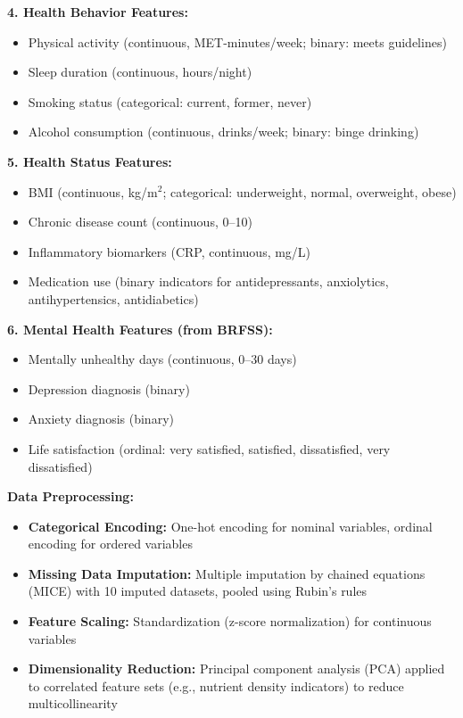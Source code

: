 \documentclass[journal,twoside,10pt]{IEEEtran}
\begin{document}
\textbf{4. Health Behavior Features:}
\begin{itemize}
\item Physical activity (continuous, MET-minutes/week; binary: meets guidelines)
\item Sleep duration (continuous, hours/night)
\item Smoking status (categorical: current, former, never)
\item Alcohol consumption (continuous, drinks/week; binary: binge drinking)
\end{itemize}

\textbf{5. Health Status Features:}
\begin{itemize}
\item BMI (continuous, kg/m$^2$; categorical: underweight, normal, overweight, obese)
\item Chronic disease count (continuous, 0--10)
\item Inflammatory biomarkers (CRP, continuous, mg/L)
\item Medication use (binary indicators for antidepressants, anxiolytics, antihypertensics, antidiabetics)
\end{itemize}

\textbf{6. Mental Health Features (from BRFSS):}
\begin{itemize}
\item Mentally unhealthy days (continuous, 0--30 days)
\item Depression diagnosis (binary)
\item Anxiety diagnosis (binary)
\item Life satisfaction (ordinal: very satisfied, satisfied, dissatisfied, very dissatisfied)
\end{itemize}

\textbf{Data Preprocessing:}
\begin{itemize}
\item \textbf{Categorical Encoding:} One-hot encoding for nominal variables, ordinal encoding for ordered variables
\item \textbf{Missing Data Imputation:} Multiple imputation by chained equations (MICE) with 10 imputed datasets, pooled using Rubin's rules
\item \textbf{Feature Scaling:} Standardization (z-score normalization) for continuous variables
\item \textbf{Dimensionality Reduction:} Principal component analysis (PCA) applied to correlated feature sets (e.g., nutrient density indicators) to reduce multicollinearity
\end{itemize}
\end{document}
